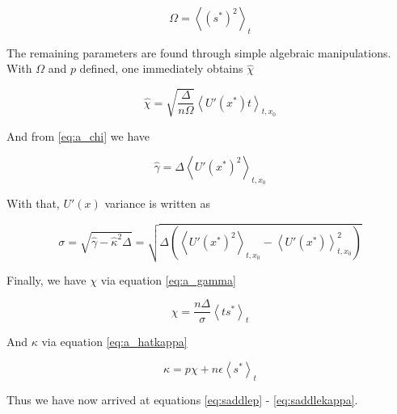 \begin{equation}
  \label{eq:a_57}
\Omega = \left\langle (s^*)^2 \right\rangle_t
\end{equation}

The remaining parameters are found through simple algebraic manipulations. With $\Omega$ and $p$ defined, one immediately obtains $\hat{\chi}$

\begin{equation}
  \label{eq:a_58}
\hat{\chi} = \sqrt{\frac{\Delta}{n\Omega}} \left \langle U'(x^*) t
\right \rangle_{t,x_0}
\end{equation}

And from \eqref{eq:a_chi} we have

 \begin{equation}
  \label{eq:a_59}
\hat{\gamma} =
\Delta \left \langle U'(x^*)^2 \right \rangle_{t,x_0}
\end{equation}

With that, $U'(x)$ variance is written as

\begin{equation}
  \label{eq:a_60}
\sigma = \sqrt{\hat{\gamma} - \hat{\kappa}^2 \Delta} = \sqrt{\Delta
    \left(\left \langle U'(x^*)^2 \right \rangle_{t,x_0} - \left
        \langle U'(x^*) \right \rangle_{t,x_0}^2 \right)}
\end{equation}

Finally, we have $\chi$ via equation \eqref{eq:a_gamma}

  \begin{equation}
    \label{eq:a_61}
    \chi = \frac{n\Delta}{\sigma} \left \langle t s^* \right \rangle_t
  \end{equation}

And $\kappa$ via equation \eqref{eq:a_hatkappa}

\begin{equation}
  \label{eq:a_62}
  \kappa = p \chi + n\epsilon \left \langle s^* \right \rangle_t
\end{equation}

Thus we have now arrived at equations \eqref{eq:saddlep} - \eqref{eq:saddlekappa}.
